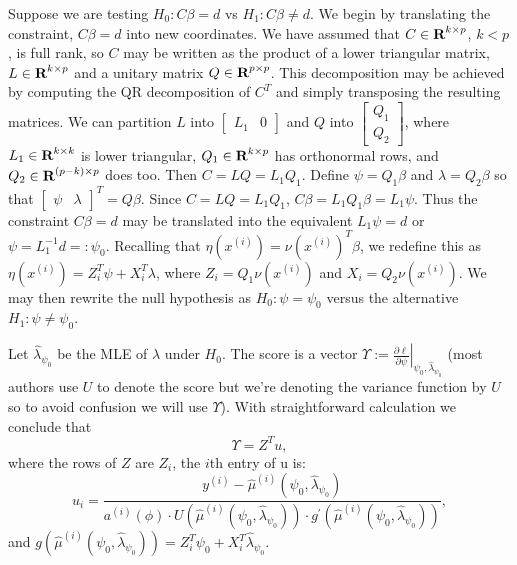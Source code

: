 \documentclass[12pt]{article}
\begin{document}
Suppose we are testing $H_0: C\beta = d$ vs $H_1: C\beta \neq d$. We begin by translating the constraint, $C\beta = d$ into new coordinates. We have assumed that $C \in {\mbox{\bf R}}^{k \times p}$, $k < p$, is full rank, so $C$ may be written as the product of a lower triangular matrix, $L \in {\mbox{\bf R}}^{k \times p}$ and a unitary matrix $Q \in {\mbox{\bf R}}^{p \times p}$. This decomposition may be achieved by computing the QR decomposition of $C^T$ and simply transposing the resulting matrices. We can partition $L$ into $\left[ \begin{array}{ll} L_1 & 0 \end{array}\right]$ and $Q$ into $\left[ \begin{array}{l} Q_1 \\ Q_2 \end{array} \right]$, where $L_1 \in {\mbox{\bf R}}^{k \times k}$ is lower triangular, $Q_1 \in {\mbox{\bf R}}^{k \times p}$ has orthonormal rows, and $Q_2 \in {\mbox{\bf R}}^{(p-k) \times p}$ does too. Then $C = LQ = L_1 Q_1$. Define $\psi = Q_1 \beta$ and $\lambda = Q_2 \beta$ so that $\left[ \begin{array}{ll} \psi & \lambda \end{array}\right]^T = Q \beta$. Since $C = LQ = L_1 Q_1$, $C \beta = L_1 Q_1 \beta = L_1 \psi$. Thus the constraint $C \beta = d$ may be translated into the equivalent $L_1 \psi = d$ or $\psi = L_1^{-1} d =: \psi_0$. Recalling that $\eta(x^{(i)}) = \nu(x^{(i)})^T \beta$, we redefine this as $\eta(x^{(i)}) = Z_i^T \psi + X_i^T \lambda$, where $Z_i = Q_1 \nu(x^{(i)})$ and $X_i = Q_2 \nu(x^{(i)})$. We may then rewrite the null hypothesis as $H_0: \psi = \psi_0$ versus the alternative $H_1: \psi \neq \psi_0$.

Let $\hat{\lambda}_{\psi_0}$ be the MLE of $\lambda$ under $H_0$. The score is a vector $\Upsilon := \left. \frac{\partial \ell}{\partial \psi} \right |_{\psi_0, \hat{\lambda}_{\psi_0}}$ (most authors use $U$ to denote the score but we're denoting the variance function by $U$ so to avoid confusion we will use $\Upsilon$). With straightforward calculation we conclude that
\begin{displaymath}
    \Upsilon = Z^T u,
\end{displaymath}
where the rows of $Z$ are $Z_i$, the $i$th entry of u is:
\begin{displaymath}
   u_i = \frac{y^{(i)} - \hat{\mu}^{(i)}(\psi_0, \hat{\lambda}_{\psi_0})}{a^{(i)}(\phi) \cdot U(\hat{\mu}^{(i)}(\psi_0, \hat{\lambda}_{\psi_0})) \cdot g^\prime(\hat{\mu}^{(i)}(\psi_0, \hat{\lambda}_{\psi_0}))},
\end{displaymath}
and $g\left(\hat{\mu}^{(i)}(\psi_0, \hat{\lambda}_{\psi_0})\right) = Z_i^T \psi_0 + X_i^T \hat{\lambda}_{\psi_0}$.
\end{document}
